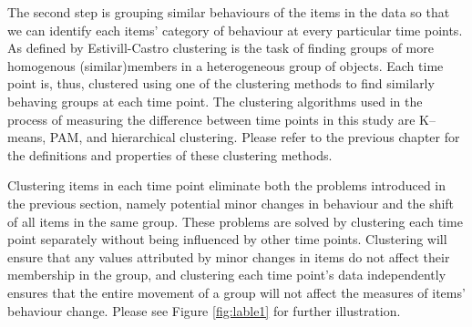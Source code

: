 The second step is grouping similar behaviours of the items in the data so that we can identify each items' category of behaviour at every particular time points. As defined by Estivill-Castro \cite{Estivill-Castro2002} clustering is the task of finding groups of more homogenous (similar)members in a heterogeneous group of objects. Each time point is, thus, clustered using one of the clustering methods to find similarly behaving groups at each time point. The clustering algorithms used in the process of measuring the difference between time points in this study are K--means, PAM, and hierarchical clustering. Please refer to the previous chapter for the definitions and properties of these clustering methods.

Clustering items in each time point eliminate both the problems introduced in the previous section, namely potential minor changes in behaviour and the shift of all items in the same group. These problems are solved by clustering each time point separately without being influenced by other time points. Clustering will ensure that any values attributed by minor changes in items do not affect their membership in the group, and clustering each time point's data independently ensures that the entire movement of a group will not affect the measures of items' behaviour change. Please see Figure \ref{fig:lable1} for further illustration.

